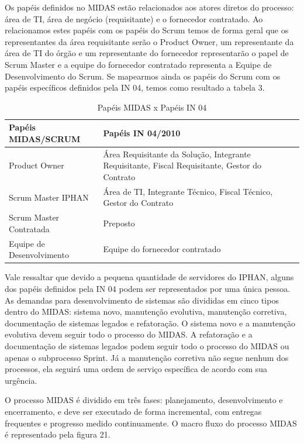 \begin{anexosenv}
Os papéis definidos no MIDAS estão relacionados aos atores diretos do processo: área de TI, área de negócio (requisitante) e o fornecedor contratado. Ao relacionamos estes papéis com os papéis do Scrum temos de forma geral que os representantes da área requisitante serão o Product Owner, um representante da área de TI do órgão e um representante do fornecedor representarão o papel de Scrum Master e a equipe do fornecedor contratado representa a Equipe de Desenvolvimento do Scrum. Se mapearmos ainda os papéis do Scrum com os papéis específicos definidos pela IN 04, temos como resultado a tabela 3. 

\begin{table}[H]
\center
\footnotesize
\begin{tabular}{|p{6cm}|p{6cm}|}
  \hline
   \textbf{Papéis MIDAS/SCRUM} & \textbf{Papéis IN 04/2010}\\
    \hline
   Product Owner & Área Requisitante da Solução, Integrante Requisitante, Fiscal Requisitante, Gestor do Contrato\\
   \hline    
    Scrum Master IPHAN & Área de TI, Integrante Técnico, Fiscal Técnico, Gestor do Contrato\\
    \hline
   Scrum Master Contratada & Preposto\\
   \hline
    Equipe de Desenvolvimento & Equipe do fornecedor contratado\\
   \hline
\end{tabular}
\caption{Papéis MIDAS x Papéis IN 04}
\end{table}

Vale ressaltar que devido a pequena quantidade de servidores do IPHAN, alguns dos papéis definidos pela IN 04  podem ser representados por uma única pessoa.
As demandas para desenvolvimento de sistemas são divididas em cinco tipos dentro do MIDAS: sistema novo, manutenção evolutiva, manutenção corretiva, documentação de sistemas legados e refatoração.  O sistema novo e a manutenção evolutiva devem seguir todo o processo do MIDAS. A refatoração e a documentação de sistemas legados podem seguir todo o processo do MIDAS ou apenas o subprocesso Sprint. Já a manutenção corretiva não segue nenhum dos processos, ela seguirá uma ordem de serviço específica de acordo com sua urgência.

O processo MIDAS é dividido em três fases: planejamento, desenvolvimento e encerramento, e deve ser executado de forma incremental, com entregas frequentes e progresso medido continuamente. O macro fluxo do processo MIDAS é representado pela figura 21.


\end{anexosenv}
